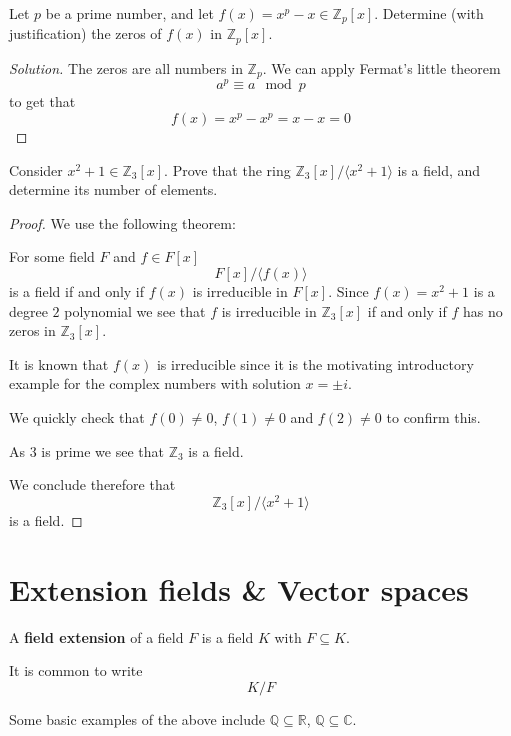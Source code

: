 \newpage
\begin{prob}
    Let $p$ be a prime number, and let 
    $f(x) = x^p - x \in \mathbb Z_p[x]$.
    Determine (with justification) the zeros of 
    $f(x)$ in $\mathbb Z_p[x]$.
\end{prob}
\begin{proof}[Solution]
    The zeros are all numbers in $\mathbb Z_p$. 
    We can apply Fermat's little theorem 
    \[
        a^p \equiv a \mod p
    \]
    to get that 
    \[
        f(x) = x^p - x^p = x-x = 0
    \]
\end{proof}
\begin{prob}
    Consider $x^2 + 1 \in \mathbb Z_3[x]$. Prove that the ring 
    $\mathbb Z_3[x]/\langle x^2 + 1\rangle$ is a field, and 
    determine its number of elements. 
\end{prob}
\begin{proof}
    We use the following theorem: 
    
    For some field $F$ and $f \in F[x]$ 
    \[
        F[x]/\langle f(x) \rangle
    \] 
    is a field if and only if $f(x)$ is irreducible in $F[x]$. 
    Since $f(x) = x^2 + 1$ is a degree $2$ polynomial we see 
    that $f$ is irreducible in $\mathbb Z_3[x]$ if and only if 
    $f$ has no zeros in $\mathbb Z_3[x]$. 

    It is known that $f(x)$ is irreducible since it is the motivating
    introductory example for the complex numbers with solution 
    $x = \pm i$. 

    We quickly check that $f(0) \neq 0$, $f(1) \neq 0$ and 
    $f(2) \neq 0$ to confirm this. 

    As $3$ is prime we see that $\mathbb Z_3$ is a field. 

    We conclude therefore that 
    \[
        \mathbb Z_3[x]/\langle x^2 + 1\rangle
    \]
    is a field.
\end{proof}

\newpage 
\section{Extension fields \& Vector spaces}
\begin{defn}
    A \textbf{field extension} of a field $F$ is a field 
    $K$ with $F \subseteq K$.

    It is common to write 
    \[
        K / F
    \]
\end{defn}
Some basic examples of the above include $\mathbb Q \subseteq 
\mathbb R$, $\mathbb Q \subseteq \mathbb C$. 


